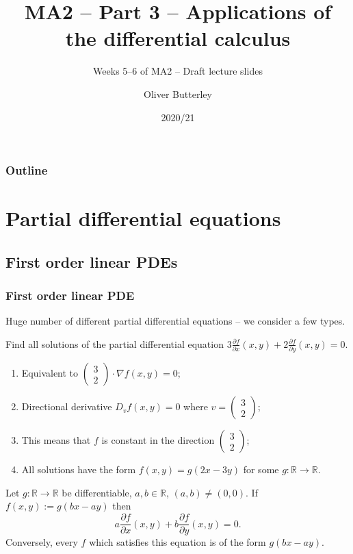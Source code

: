 \documentclass[aspectratio=169,handout]{beamer}
\title{MA2 -- Part 3 -- Applications of the differential calculus}
\subtitle{Weeks 5--6 of MA2 -- Draft lecture slides}
\author[]{Oliver Butterley}
\institute{University of Rome Tor Vergata}
\date{2020/21}
\newcommand{\bR}{\mathbb{R}} %
\begin{document}
\frame{\titlepage}

\begin{frame}
    \frametitle{Outline}
    \tableofcontents
\end{frame}

\section{Partial differential equations}

\subsection{First order linear PDEs}

\begin{frame}
    \frametitle{First order linear PDE}

    Huge number of different partial differential equations -- we consider a few types.

    \begin{example}
        Find all solutions of the partial differential equation
        \(3 \frac{\partial f}{\partial x}(x,y) + 2 \frac{\partial f}{\partial y} (x,y) = 0\).
    \end{example}


    \begin{enumerate}
        \item Equivalent to
              \(\left( \begin{smallmatrix}
                  3 \\ 2
              \end{smallmatrix} \right)
              \cdot
              \nabla f(x,y) =0\);
        \item Directional derivative \( D_{v}f(x,y) = 0\) where \(v=\left( \begin{smallmatrix}
                      3 \\ 2
                  \end{smallmatrix} \right)\);
        \item This means that \(f\) is constant in the direction \(\left( \begin{smallmatrix}
                  3 \\ 2
              \end{smallmatrix} \right)\);
        \item All solutions have the form \(f(x,y) = g(2x-3y)\) for some \(g:\bR \to \bR\).
    \end{enumerate}

    \begin{theorem}
        Let \(g:\bR\to\bR\) be differentiable, \(a,b\in \bR\), \((a,b)\neq (0,0)\).
        If \(f(x,y):= g(bx-ay)\) then
        \[
            a \frac{\partial f}{\partial x} (x,y) + b \frac{\partial f}{\partial y} (x,y) = 0.
        \]
        Conversely, every \(f\) which satisfies this equation is of the form \(g(bx-ay)\).
    \end{theorem}

\end{frame}
\end{document}
